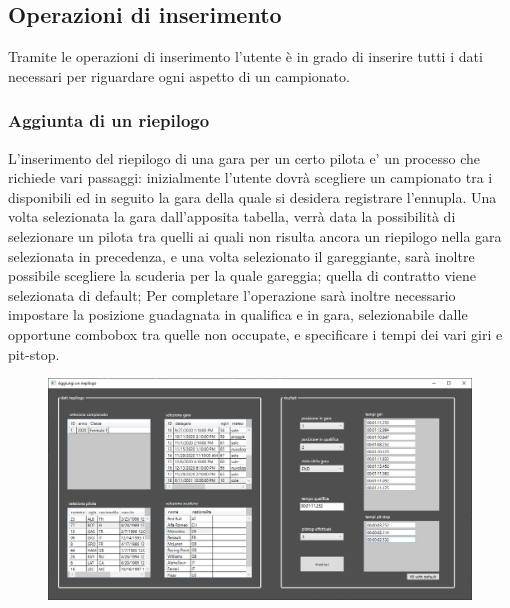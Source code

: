 \documentclass[a4paper,12pt]{report}
\begin{document}
			\subsection{Operazioni di inserimento}
				Tramite le operazioni di inserimento l'utente è in grado di inserire tutti i dati necessari per riguardare ogni aspetto di un campionato.
				\subsubsection{Aggiunta di un riepilogo}
					L'inserimento del riepilogo di una gara per un certo pilota e' un processo che richiede vari passaggi:
					inizialmente l'utente dovrà scegliere un campionato tra i disponibili ed in seguito la gara della quale si desidera registrare
					l'ennupla.
					Una volta selezionata la gara dall'apposita tabella, verrà data la possibilità di selezionare un pilota tra quelli 
					ai quali non risulta ancora un riepilogo nella gara selezionata in precedenza, e una volta selezionato il gareggiante,
					sarà inoltre possibile scegliere la scuderia per la quale gareggia; quella di contratto viene selezionata di default;
					Per completare l'operazione sarà inoltre necessario impostare la posizione guadagnata in qualifica e in gara, selezionabile
					dalle opportune combobox tra quelle non occupate, e specificare i tempi dei vari giri e pit-stop.
					\begin{figure}[htbp]
						\centering
						\includegraphics[scale=0.8]{copies/riepilogo.png}
					\end{figure}
\end{document}
